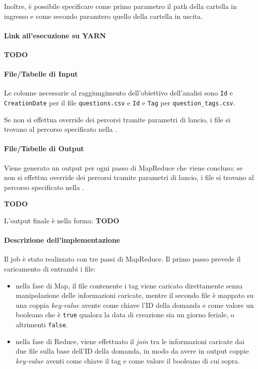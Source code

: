   Inoltre, è possibile specificare come primo parametro il path della cartella in ingresso e come secondo paramtero quello della cartella in uscita.

  \paragraph{Link all'esecuzione su YARN}\label{par:job1:mapreduce:yarn}

  \textbf{TODO}

  \paragraph{File/Tabelle di Input}\label{par:job1:mapreduce:input}

  Le colonne necessarie al raggiungimento dell'obiettivo dell'analisi sono \texttt{Id} e \texttt{CreationDate} per il file \texttt{questions.csv}
  e \texttt{Id} e \texttt{Tag} per \texttt{question\_tags.csv}.

  Se non si effettua override dei percorsi tramite parametri di lancio, i file si trovano al percorso specificato nella .

  \paragraph{File/Tabelle di Output}\label{par:job1:mapreduce:output}

  Viene generato un output per ogni passo di MapReduce che viene concluso;
  se non si effettua override dei percorsi tramite parametri di lancio, i file si trovano al percorso specificato nella .

  \textbf{TODO}

  L'output finale è nella forma: \textbf{TODO}

  \paragraph{Descrizione dell'implementazione}\label{par:job1:mapreduce:implementation}

  Il job è stato realizzato con tre passi di MapReduce.
  Il primo passo prevede il caricamento di entrambi i file:
  \begin{itemize}
    \item
      nella fase di Map, il file contenente i tag viene caricato direttamente senza manipolazione delle informazioni caricate,
      mentre il secondo file è mappato su una coppia \textit{key-value} avente come chiave l'ID della domanda
      e come valore un booleano che è \texttt{true} qualora la data di creazione sia un giorno feriale, o altrimenti \texttt{false}.
    \item
      nella fase di Reduce, viene effettuato il \textit{join} tra le informazioni caricate dai due file sulla base dell'ID della domanda,
      in modo da avere in output coppie \textit{key-value} aventi come chiave il tag e come valore il booleano di cui sopra.
  \end{itemize}


